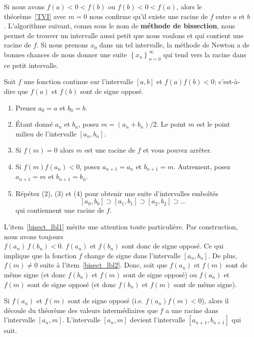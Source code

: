 {Si nous avons $f(a) < 0 < f(b)$ ou $f(b) < 0 < f(a)$, alors le
théorème~\ref{TVI} avec $m=0$ nous confirme qu'il existe une racine de
$f$ entre $a$ et $b$.  L'algorithme suivant, connu sous le nom de
{\bfseries méthode de bissection}, nous permet de trouver un
intervalle aussi petit que nous voulons et qui contient une racine de
$f$.  Si nous prenons $x_0$ dans un tel intervalle, la méthode de Newton a
de bonnes chances de nous donner une suite
$\displaystyle \left\{x_n\right\}_{n=0}^\infty$ qui tend vers la
racine dans ce petit intervalle.

\begin{focus}{\mth} 
Soit $f$ une fonction continue sur l'intervalle $[a,b]$ et
$f(a) f(b) < 0$;  c'est-à-dire que $f(a)$ et $f(b)$ sont de signe
opposé.
\begin{enumerate}
\item Prenez $a_0=a$ et $b_0=b$.
\item Étant donné $a_n$ et $b_n$, posez $m = (a_n+b_n)/2$.  Le point
$m$ est le point milieu de l'intervalle $[a_n,b_n]$.
\item Si $f(m)=0$ alors $m$ est une racine de $f$ et vous pouvez arrêter.
\label{bisect_lbl2}
\item Si $f(m)f(a_n) < 0$, posez $a_{n+1}=a_n$ et $b_{n+1}=m$.
Autrement, posez $a_{n+1}=m$ et $b_{n+1}=b_n$.\label{bisect_lbl1}
\item Répétez (2), (3) et (4) pour obtenir une suite d'intervalles
emboîtés
\[
[a_0,b_0] \supset [a_1, b_1] \supset [a_2, b_2] \supset \ldots
\]
qui contiennent une racine de $f$.
\end{enumerate}
\end{focus}

L'item~\ref{bisect_lbl1} mérite une attention toute particulière.  Par
construction, nous avons toujours\\
$f(a_n)\,f(b_n)<0$.  $f(a_n)$ et
$f(b_n)$ sont donc de signe opposé.  Ce qui implique que la fonction $f$
change de signe dans l'intervalle $[a_n,b_n]$.  De plus, $f(m) \neq 0$
suite à l'item~\ref{bisect_lbl2}.  Donc, soit que $f(a_n)$ et $f(m)$
sont de même signe (et donc $f(b_n)$ et $f(m)$ sont de signe opposé)
ou $f(a_n)$ et $f(m)$ sont de signe opposé (et donc $f(b_n)$ et $f(m)$
sont de même signe).

Si $f(a_n)$ et $f(m)$ sont de signe opposé (i.e. $f(a_n)f(m)<0$), alors
il découle du théorème des valeurs intermédiaires que $f$ a une racine dans
l'intervalle $[a_n,m]$.  L'intervalle $[a_n,m]$ devient l'intervalle
$[a_{n+1},b_{n+1}]$ qui suit.

}
